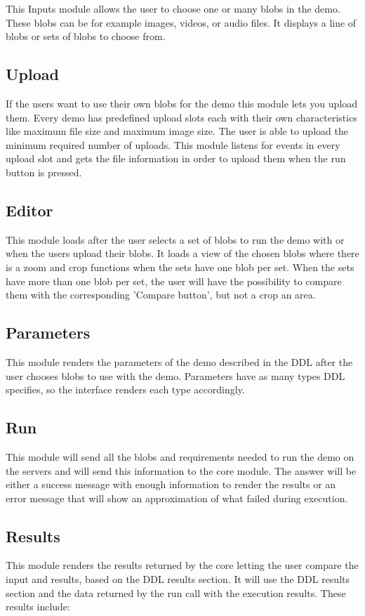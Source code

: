 This Inputs module allows the user to choose one or many blobs in the demo. These blobs can be for example images, videos, or audio files. It displays a line of blobs or sets of blobs to choose from.


\subsection{Upload}
If the users want to use their own blobs for the demo this module lets you upload them. Every demo has predefined 
upload slots each with their own characteristics like maximum file size and maximum image size. The user is able to upload the 
minimum required number of uploads. This module listens for events in every upload slot and gets the file information in order to 
upload them when the run button is pressed.


\subsection{Editor}
This module loads after the user selects a set of blobs to run the demo with or when the users upload their blobs. It loads a view of
the chosen blobs where there is a zoom and crop functions when the sets have one blob per set. When the sets have more than 
one blob per set, the user will have the possibility to compare them with the corresponding 'Compare button', but not a crop 
an area.

\subsection{Parameters}
This module renders the parameters of the demo described in the DDL after the user chooses blobs to use with the demo. 
Parameters have as many types DDL specifies, so the interface renders each type accordingly.

\subsection{Run}
This module will send all the blobs and requirements needed to run the demo on the servers and will send this information to 
the core module. The answer will be either a success message with enough information to render the results or an error message 
that will show an approximation of what failed during execution.

\subsection{Results}
This module renders the results returned by the core letting the user compare the input and results, based on the DDL results section. 
It will use the DDL results section and the data returned by the run call with the execution results. These results include:

